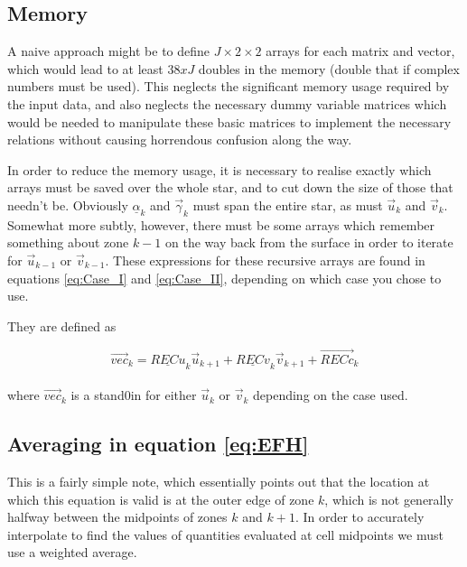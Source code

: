 \documentclass[11pt]{amsart}
\begin{document}
\subsection{Memory}

A naive approach might be to define $J \times 2 \times 2$ arrays for each matrix and vector, which would lead to at least $38 x J$ doubles in the memory (double that if complex numbers must be used).  This neglects the significant memory usage required by the input data, and also neglects the necessary dummy variable matrices which would be needed to manipulate these basic matrices to implement the necessary relations without causing horrendous confusion along the way.

In order to reduce the memory usage, it is necessary to realise exactly which arrays must be saved over the whole star, and to cut down the size of those that needn't be.  Obviously $\underline{\alpha}_{k}$ and $\vec{\gamma}_{k}$ must span the entire star, as must $\vec{u}_{k}$ and $\vec{v}_{k}$.  Somewhat more subtly, however, there must be some arrays which remember something about zone $k-1$ on the way back from the surface in order to iterate for $\vec{u}_{k-1}$ or $\vec{v}_{k-1}$.  These expressions for these recursive arrays are found in equations \ref{eq:Case_I} and \ref{eq:Case_II}, depending on which case you chose to use.

They are defined as

\begin{equation} \label{eq:REC_def}
\vec{vec}_{k}  =  \underline{RECu}_{k} \vec{u}_{k+1}  +  \underline{RECv}_{k} \vec{v}_{k+1}  +  \vec{RECc}_{k}
\end{equation}
\\
where $\vec{vec}_{k}$ is a stand0in for either $\vec{u}_{k}$ or $\vec{v}_{k}$ depending on the case used.





\subsection{Averaging in equation \ref{eq:EFH}}

This is a fairly simple note, which essentially points out that the location at which this equation is valid is at the outer edge of zone $k$, which is not generally halfway between the midpoints of zones $k$ and $k+1$.  In order to accurately interpolate to find the values of quantities evaluated at cell midpoints we must use a weighted average.
\end{document}
